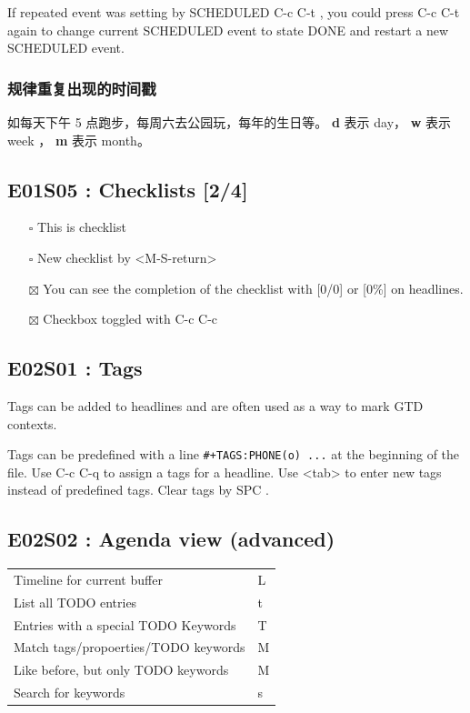 \documentclass[11pt]{article}
\begin{document}
If repeated event was setting by SCHEDULED  C-c C-t
 , you could press  C-c C-t 
again to change current SCHEDULED event to state DONE and restart a new
SCHEDULED event.

\subsubsection{规律重复出现的时间戳}
\label{sec:orgb6ea9e3}
如每天下午 5 点跑步，每周六去公园玩，每年的生日等。
\textbf{d} 表示 day， \textbf{w} 表示 week ， \textbf{m} 表示 month。
\subsection{E01S05 : Checklists [2/4]}
\label{sec:orgd6db2a8}
\begin{itemize}
\item[{$\square$}] This is checklist
\item[{$\square$}] New checklist by  <M-S-return>
\item[{$\boxtimes$}] You can see the completion of the checklist with [0/0] or [0\%] on headlines.
\item[{$\boxtimes$}] Checkbox toggled with  C-c C-c
\end{itemize}
\subsection{E02S01 : Tags}
\label{sec:orgfe5fbc8}
Tags can be added to headlines and are often used as a way to mark GTD contexts.

Tags can be predefined with a line \texttt{\#+TAGS:PHONE(o) ...} at the beginning of
the file. Use  C-c C-q  to assign a tags for a
headline. Use  <tab>  to enter new tags instead
of predefined tags. Clear tags by  SPC  .

\subsection{E02S02 : Agenda view (advanced)}
\label{sec:org261f11b}
\begin{center}
\begin{tabular}{ll}
Timeline for current buffer &  L \\
List all TODO entries &  t \\
Entries with a special TODO Keywords &  T \\
Match tags/propoerties/TODO keywords &  M \\
Like before, but only TODO keywords &  M \\
Search for keywords &  s \\
\end{tabular}
\end{center}
\end{document}
